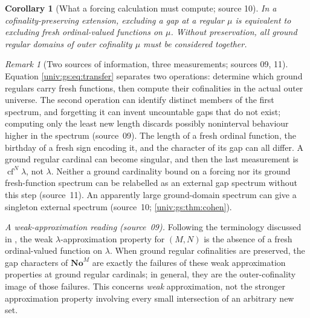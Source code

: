 \documentclass[11pt,letterpaper]{article}
\numberwithin{equation}{section}
\newtheorem{corollary}[corollary]{Corollary}
\theoremstyle{definition}
\theoremstyle{remark}
\newtheorem{remark}[remark]{Remark}
\newcommand{\No}{\mathbf{No}}
\newcommand{\NoM}{\No^{M}}
\newcommand{\cf}{\operatorname{cf}}
\begin{document}
\begin{corollary}[What a forcing calculation must compute; source 10]\label{univ:gs:cor:fibres}
In a cofinality-preserving extension, excluding a gap at a regular $\mu$ is
equivalent to excluding fresh ordinal-valued functions on $\mu$. Without
preservation, all ground regular domains of outer cofinality $\mu$ must be
considered together.
\end{corollary}

\begin{remark}[Two sources of information, three measurements; sources 09, 11]\label{univ:gs:rem:measurements}
Equation \eqref{univ:gs:eq:transfer} separates two operations: determine which
ground regulars carry fresh functions, then compute their cofinalities in the
actual outer universe. The second operation can identify distinct members of
the first spectrum, and forgetting it can invent uncountable gaps that do not
exist; computing only the least new length discards possibly noninterval
behaviour higher in the spectrum (source~09). The length of a fresh ordinal
function, the birthday of a fresh sign encoding it, and the character of its gap
can all differ. A ground regular cardinal can become singular, and then the last
measurement is $\cf^N\lambda$, not $\lambda$. Neither a ground cardinality bound
on a forcing nor its ground fresh-function spectrum can be relabelled as an
external gap spectrum without this step (source~11). An apparently large
ground-domain spectrum can give a singleton external spectrum (source~10;
\cref{univ:gs:thm:cohen}).
\end{remark}

\emph{A weak-approximation reading (source~09).} Following the terminology
discussed in \cite{FKW}, the weak $\lambda$-approximation property for $(M,N)$ is
the absence of a fresh ordinal-valued function on $\lambda$. When ground regular
cofinalities are preserved, the gap characters of $\NoM$ are exactly the failures
of these weak approximation properties at ground regular cardinals; in general,
they are the outer-cofinality image of those failures. This concerns \emph{weak}
approximation, not the stronger approximation property involving every small
intersection of an arbitrary new set.
\end{document}
